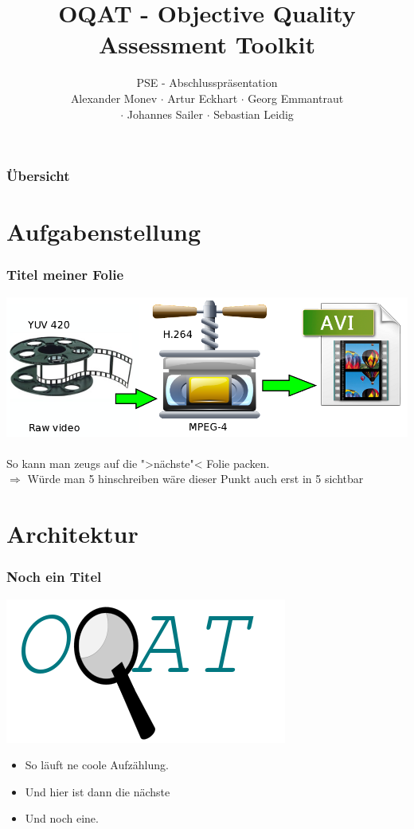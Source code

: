 \documentclass[t]{beamer}
\title{OQAT - Objective Quality Assessment Toolkit}
\subtitle{PSE - Abschlusspräsentation \\[0.3cm]
Alexander Monev $\cdot$ Artur Eckhart $\cdot$ Georg Emmantraut\\ $\cdot$ Johannes Sailer  $\cdot$ Sebastian
Leidig}
\institute[ITEC]{Institut für Technische Informatik}
\begin{document}
\begin{frame}
	\maketitle
\end{frame}

\begin{frame}
	\frametitle{Übersicht}
	\tableofcontents
\end{frame}

\section{Aufgabenstellung}
\begin{frame}
	\frametitle{Titel meiner Folie}
	\begin{center}
		\vspace*{\fill}
		\includegraphics[scale=.2]{img/encodingProcess.png}
		\vspace*{\fill} ~\\
		\onslide<2-> So kann man zeugs auf die ">nächste"< Folie packen. ~\\
		\onslide<3-> $ \Longrightarrow $ Würde man 5 hinschreiben wäre 
									dieser Punkt auch erst in 5 sichtbar
	\end{center}
\end{frame}
\section{Architektur}
\begin{frame}
	\frametitle{Noch ein Titel}
	\begin{minipage}{5.5cm}
		\includegraphics[scale=.29]{img/oqatLogo}	
	\end{minipage}
	\begin{minipage}{5.5cm}
		\begin{itemize}
		\item <+-> So läuft ne coole Aufzählung.
		\item <+-> Und hier ist dann die nächste
		\item <+-> Und noch eine.
		\end{itemize}
	\end{minipage}
\end{frame}
\end{document}
